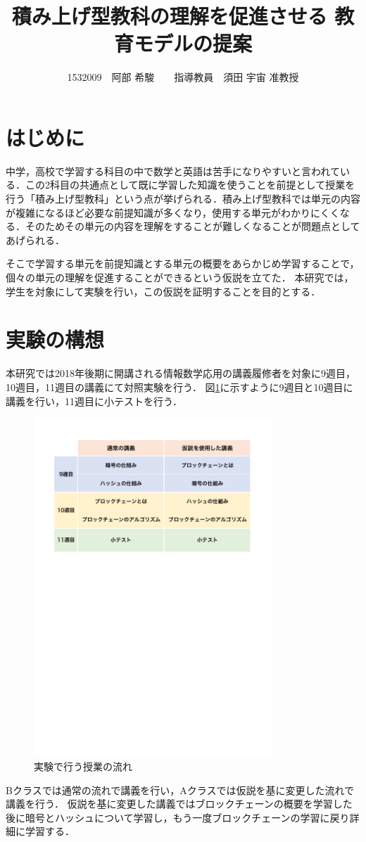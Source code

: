 \documentclass[twocolumn,10pt,a4j]{jsarticle}
\title{積み上げ型教科の理解を促進させる
教育モデルの提案}
\author{1532009　阿部 希駿　　指導教員　須田 宇宙 准教授}
\date{}
\begin{document}
\maketitle

\section{はじめに}

中学，高校で学習する科目の中で数学と英語は苦手になりやすいと言われている\cite{1}．この2科目の共通点として既に学習した知識を使うことを前提として授業を行う「積み上げ型教科」という点が挙げられる．積み上げ型教科では単元の内容が複雑になるほど必要な前提知識が多くなり，使用する単元がわかりにくくなる．そのためその単元の内容を理解をすることが難しくなることが問題点としてあげられる．


そこで学習する単元を前提知識とする単元の概要をあらかじめ学習することで，個々の単元の理解を促進することができるという仮説を立てた．
本研究では，学生を対象にして実験を行い，この仮説を証明することを目的とする．


\section{実験の構想}

本研究では2018年後期に開講される情報数学応用の講義履修者を対象に9週目，10週目，11週目の講義にて対照実験を行う．
図\ref{fig:time}に示すように9週目と10週目に講義を行い，11週目に小テストを行う．

\begin{figure}[H]
\centering
\includegraphics[mediaboxonly=/CropBox,width=9cm]{timeline.pdf}
\caption{実験で行う授業の流れ}
\label{fig:time}
\end{figure}
Bクラスでは通常の流れで講義を行い，Aクラスでは仮説を基に変更した流れで講義を行う．
仮説を基に変更した講義ではブロックチェーンの概要を学習した後に暗号とハッシュについて学習し，もう一度ブロックチェーンの学習に戻り詳細に学習する．
\end{document}

